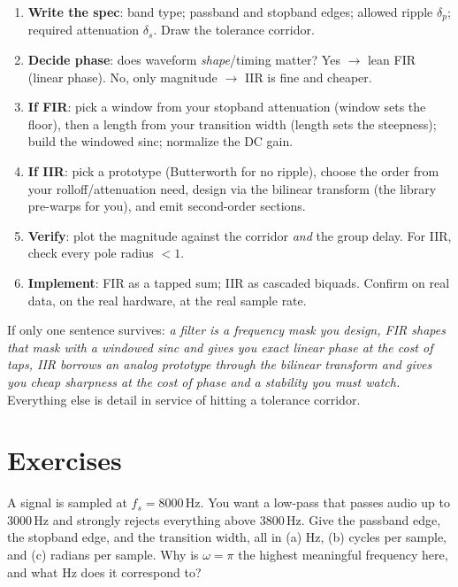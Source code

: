 \begin{enumerate}
\item \textbf{Write the spec}: band type; passband and stopband edges; allowed
ripple $\delta_p$; required attenuation $\delta_s$. Draw the tolerance corridor.
\item \textbf{Decide phase}: does waveform \emph{shape}/timing matter? Yes $\to$
lean FIR (linear phase). No, only magnitude $\to$ IIR is fine and cheaper.
\item \textbf{If FIR}: pick a window from your stopband attenuation (window sets
the floor), then a length from your transition width (length sets the steepness);
build the windowed sinc; normalize the DC gain.
\item \textbf{If IIR}: pick a prototype (Butterworth for no ripple), choose the
order from your rolloff/attenuation need, design via the bilinear transform (the
library pre-warps for you), and emit second-order sections.
\item \textbf{Verify}: plot the magnitude against the corridor \emph{and} the
group delay. For IIR, check every pole radius $< 1$.
\item \textbf{Implement}: FIR as a tapped sum; IIR as cascaded biquads. Confirm on
real data, on the real hardware, at the real sample rate.
\end{enumerate}

\begin{recoverybox}
If only one sentence survives: \emph{a filter is a frequency mask you design, FIR
shapes that mask with a windowed sinc and gives you exact linear phase at the cost
of taps, IIR borrows an analog prototype through the bilinear transform and gives
you cheap sharpness at the cost of phase and a stability you must watch.} Everything
else is detail in service of hitting a tolerance corridor.
\end{recoverybox}

\section{Exercises}
\label{ch16:exercises}

\begin{exercise}
A signal is sampled at $f_s = 8000$\,Hz. You want a low-pass that passes audio up
to $3000$\,Hz and strongly rejects everything above $3800$\,Hz. Give the passband
edge, the stopband edge, and the transition width, all in (a) Hz, (b) cycles per
sample, and (c) radians per sample. Why is $\omega = \pi$ the highest meaningful
frequency here, and what Hz does it correspond to?
\end{exercise}

